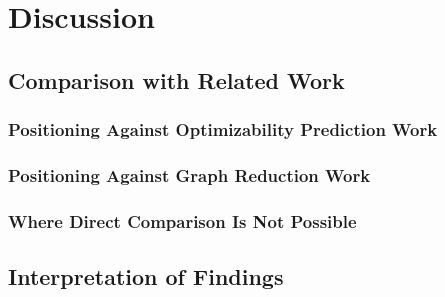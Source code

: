 \chapter{Discussion}
\label{sec:discussion}

\section{Comparison with Related Work}
\label{sec:discussion:relatedwork}

\subsection{Positioning Against Optimizability Prediction Work}
\label{sec:discussion:relatedwork:prediction}

\subsection{Positioning Against Graph Reduction Work}
\label{sec:discussion:relatedwork:reduction}

\subsection{Where Direct Comparison Is Not Possible}
\label{sec:discussion:relatedwork:incomparable}


\section{Interpretation of Findings}
\label{sec:discussion:interpretation}

